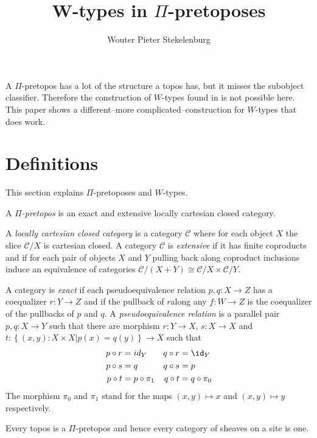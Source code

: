 \documentclass{tac}
\title{W-types in $\Pi$-pretoposes}
\author{Wouter Pieter Stekelenburg}\copyrightyear{2015}
\newcommand\hide[1]{}
\newcommand\cat\mathcal
\newcommand\set[1]{\left\{#1\right\}}
\newcommand\of:
\begin{document}
\maketitle


A $\Pi$-pretopos has a lot of the structure a topos has, but it misses the subobject classifier. Therefore the construction of $W$-types found in \hide{cite Moerdijk, van der Berg} is not possible here. This paper shows a different--more complicated--construction for $W$-types that does work.

\section{Definitions}%
This section explains $\Pi$-pretoposes and $W$-types.

\newcommand\bieq{\cong}
\begin{definition}[$\Pi$-pretopos] A \emph{$\Pi$-pretopos} is an exact and extensive locally cartesian closed category. 

A \emph{locally cartesian closed category} is a category $\cat C$ where for each object $X$ the slice $\cat C/X$ is cartesian closed.
A category $\cat C$ is \emph{extensive} if it has finite coproducts and if for each pair of objects $X$ and $Y$ pulling back along coproduct inclusions induce an equivalence of categories $\cat C/(X+Y)\bieq\cat C/X\times \cat C/Y$. 

A category is \emph{exact} if each pseudoequivalence relation $p,q\of X\to Z$ has a coequalizer $r\of Y\to Z$ and if the pullback of $r$along any $f\of W\to Z$ is the coequalizer of the pullbacks of $p$ and $q$. 
A \emph{pseudoequivalence relation} is a parallel pair $p,q\of X\to Y$ such that there are morphism $r\of Y\to X$, $s\of X\to X$ and $t\of \set{(x,y)\of X\times X|p(x)=q(y)}\to X$ such that
\begin{align*}
p\circ r&=id_Y & q\circ r&=\id_Y\\
p\circ s&=q & q\circ s&=p\\
p\circ t&=p\circ \pi_1 & q\circ t&=q\circ \pi_0
\end{align*}
The morphism $\pi_0$ and $\pi_1$ stand for the maps $(x,y)\mapsto x$ and $(x,y)\mapsto y$ respectively.
\end{definition}

\begin{example} Every topos is a $\Pi$-pretopos and hence every category of sheaves on a site is one. \end{example}
\end{document}
